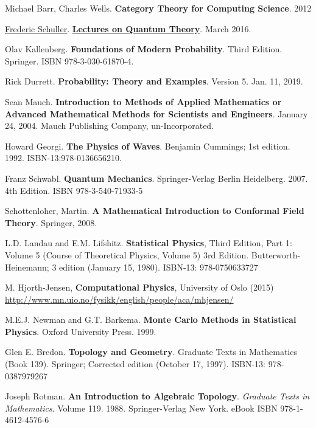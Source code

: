 \documentclass[10pt]{amsart}
\begin{document}
\begin{thebibliography}{9}
Michael Barr, Charles Wells. \textbf{Category Theory for Computing Science}. 2012

\href{https://www.youtube.com/c/FredericSchuller}{Frederic Schuller}. \href{https://youtube.com/playlist?list=PLPH7f_7ZlzxQVx5jRjbfRGEzWY_upS5K6&si=rtLLBi4xcb-Z6bfH}{\textbf{Lectures on Quantum Theory}}. March 2016.

Olav Kallenberg. \textbf{Foundations of Modern Probability}. Third Edition. Springer. ISBN 978-3-030-61870-4.

Rick Durrett. \textbf{Probability: Theory and Examples}. Version 5. Jan. 11, 2019.

Sean Mauch. \textbf{Introduction to Methods of Applied Mathematics or Advanced Mathematical Methods for Scientists and Engineers}. January 24, 2004. Mauch Publishing Company, un-Incorporated. 

Howard Georgi. \textbf{The Physics of Waves}. Benjamin Cummings; 1st edition. 1992. ISBN-13:978-0136656210.


Franz Schwabl. \textbf{Quantum Mechanics}. Springer-Verlag Berlin Heidelberg. 2007. 4th Edition. ISBN 978-3-540-71933-5

Schottenloher, Martin.  \textbf{A Mathematical Introduction to Conformal Field Theory}.  Springer, 2008.  

L.D. Landau and E.M. Lifshitz.  \textbf{Statistical Physics}, Third Edition, Part 1: Volume 5 (Course of Theoretical Physics, Volume 5) 3rd Edition.  Butterworth-Heinemann; 3 edition (January 15, 1980).  ISBN-13: 978-0750633727

M. Hjorth-Jensen, \textbf{Computational Physics}, University of Oslo (2015) \url{http://www.mn.uio.no/fysikk/english/people/aca/mhjensen/}



M.E.J. Newman and G.T. Barkema.  \textbf{Monte Carlo Methods in Statistical Physics}.  Oxford University Press.  1999.  


Glen E. Bredon.  \textbf{Topology and Geometry}. Graduate Texts in Mathematics (Book 139).  Springer; Corrected edition (October 17, 1997).  ISBN-13: 978-0387979267

Joseph Rotman. \textbf{An Introduction to Algebraic Topology}. \emph{Graduate Texts in Mathematics}. Volume 119. 1988. Springer-Verlag New York. eBook ISBN
978-1-4612-4576-6


\end{thebibliography}
\end{document}
